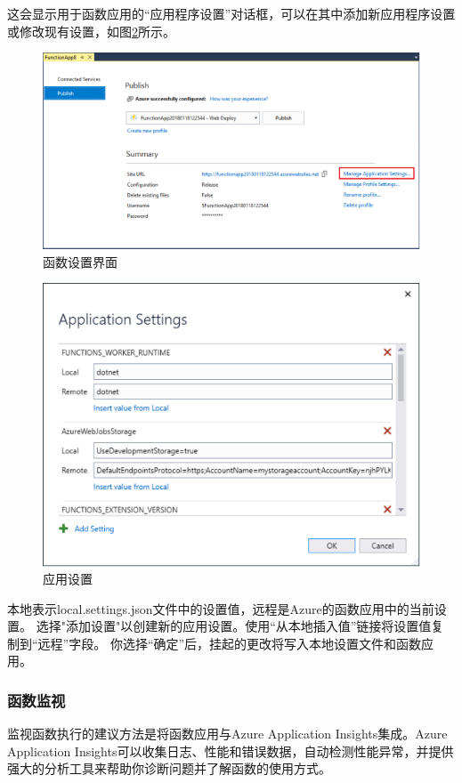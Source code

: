 \documentclass[11pt]{article}
\begin{document}
这会显示用于函数应用的“应用程序设置”对话框，可以在其中添加新应用程序设置或修改现有设置，如图\ref{fig12}所示。
\begin{figure}[h]	
	\centering
	\includegraphics[scale=0.6]{figs/11.png}        %
	\caption{函数设置界面}
	\label{fig11}	
\end{figure}
\begin{figure}[h]	
	\centering
	\includegraphics[scale=0.6]{figs/12.png}        %
	\caption{应用设置}
	\label{fig12}	
\end{figure}

本地表示local.settings.json文件中的设置值，远程是Azure的函数应用中的当前设置。 选择"添加设置"以创建新的应用设置。使用“从本地插入值”链接将设置值复制到“远程”字段。 你选择“确定”后，挂起的更改将写入本地设置文件和函数应用。

\subsubsection{函数监视} 
监视函数执行的建议方法是将函数应用与Azure Application Insights集成。Azure Application Insights可以收集日志、性能和错误数据，自动检测性能异常，并提供强大的分析工具来帮助你诊断问题并了解函数的使用方式。
\end{document}
